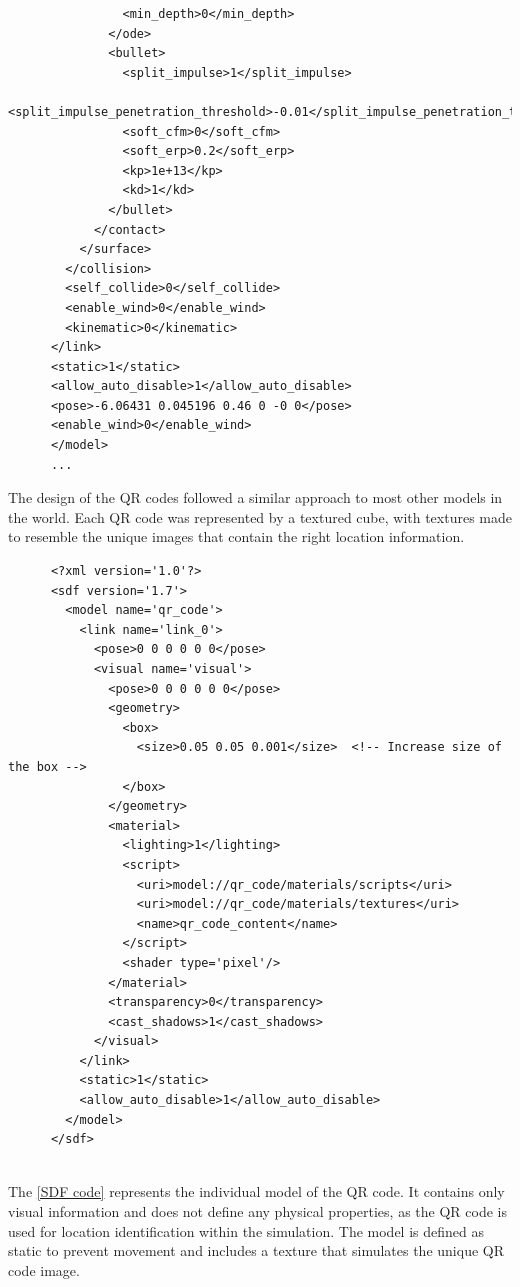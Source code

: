 \documentclass[../../main]{subfiles}
\begin{document}
\begin{codebox}[]{}
\begin{verbatim}
                <min_depth>0</min_depth>
              </ode>
              <bullet>
                <split_impulse>1</split_impulse>
                <split_impulse_penetration_threshold>-0.01</split_impulse_penetration_threshold>
                <soft_cfm>0</soft_cfm>
                <soft_erp>0.2</soft_erp>
                <kp>1e+13</kp>
                <kd>1</kd>
              </bullet>
            </contact>
          </surface>
        </collision>
        <self_collide>0</self_collide>
        <enable_wind>0</enable_wind>
        <kinematic>0</kinematic>
      </link>
      <static>1</static>
      <allow_auto_disable>1</allow_auto_disable>
      <pose>-6.06431 0.045196 0.46 0 -0 0</pose>
      <enable_wind>0</enable_wind>
      </model>
      ...
\end{verbatim}
\end{codebox}

The design of the QR codes followed a similar approach to most other models in the 
world. Each QR code was represented by a textured cube, with textures made to 
resemble the unique images that contain the right location information.
\newpage
\begin{codebox}[label=SDF code]{}
  
  \begin{verbatim}
      <?xml version='1.0'?>
      <sdf version='1.7'>
        <model name='qr_code'>
          <link name='link_0'>
            <pose>0 0 0 0 0 0</pose>
            <visual name='visual'>
              <pose>0 0 0 0 0 0</pose>
              <geometry>
                <box>
                  <size>0.05 0.05 0.001</size>  <!-- Increase size of the box -->
                </box>
              </geometry>
              <material>
                <lighting>1</lighting>
                <script>
                  <uri>model://qr_code/materials/scripts</uri>
                  <uri>model://qr_code/materials/textures</uri>
                  <name>qr_code_content</name>
                </script>
                <shader type='pixel'/>
              </material>
              <transparency>0</transparency> 
              <cast_shadows>1</cast_shadows>
            </visual>
          </link>
          <static>1</static>
          <allow_auto_disable>1</allow_auto_disable>
        </model>
      </sdf>
    
    \end{verbatim}
  \end{codebox}
    \newpage
    The \cref{SDF code} represents the individual model of the QR code. It contains 
    only visual information and does not define any physical properties, as the QR 
    code is used for location identification within the simulation. The model is defined 
    as static to prevent movement and includes a texture that simulates the unique QR 
    code image.
\end{document}
